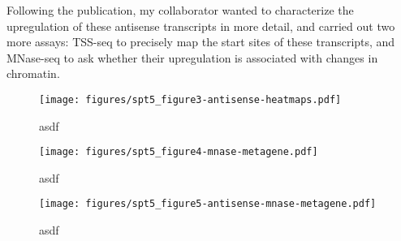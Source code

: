 \documentclass[9pt, letterpaper]{article}
\begin{document}
Following the publication, my collaborator wanted to characterize the upregulation of these antisense transcripts in more detail, and carried out two more assays: TSS-seq to precisely map the start sites of these transcripts, and MNase-seq to ask whether their upregulation is associated with changes in chromatin.

\begin{figure}[H]
\centering
\texttt{[image: figures/spt5\_figure3-antisense-heatmaps.pdf]}
\caption{asdf}
\label{fig:spt5_antisense-heatmaps}
\end{figure}

\begin{wrapfigure}[23]{l}{8.72cm}
\centering
\texttt{[image: figures/spt5\_figure4-mnase-metagene.pdf]}
\caption{asdf}
\label{fig:spt5_mnase-metagene}
\end{wrapfigure}

\begin{wrapfigure}[23]{r}{8.72cm}
\centering
\texttt{[image: figures/spt5\_figure5-antisense-mnase-metagene.pdf]}
\caption{asdf}
\label{fig:spt5_antisense-mnase-metagene}
\end{wrapfigure}

\newpage
{}

\end{document}
